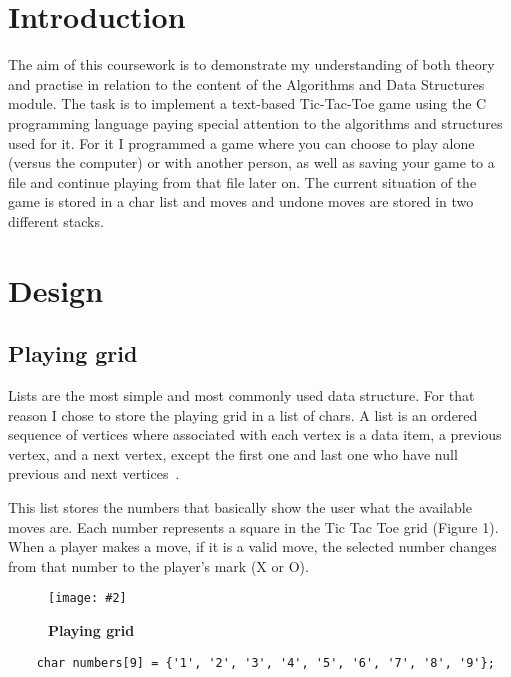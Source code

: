 \documentclass[10pt, a4paper]{article}
\title{\mytitle}
\author{\myauthor\hspace{1em}\\\contact\\Edinburgh Napier University\hspace{0.5em}-\hspace{0.5em}\mymodule}
\date{}
\newcommand{\figuremacro}[5]{
    \begin{figure}[#1]
        \centering
        \texttt{[image: \#2]}
        \caption[#3]{\textbf{#3}#4}
        \label{fig:#2}
    \end{figure}
}
\begin{document}
    \maketitle

    \section{Introduction}

The aim of this coursework is to demonstrate my understanding of both theory and practise in relation to the content of the Algorithms and Data Structures module. The task is to implement a text-based Tic-Tac-Toe game using the C programming language paying special attention to the algorithms and structures used for it. For it I programmed a game where you can choose to play alone (versus the computer) or with another person, as well as saving your game to a file and continue playing from that file later on. The current situation of the game is stored in a char list and  moves and undone moves are stored in two different stacks.

	\section{Design}

    \subsection{Playing grid}

Lists are the most simple and most commonly used data structure. For that reason I chose to store the playing grid in a list of chars. A list is an ordered sequence of vertices where associated with each vertex is a data item, a previous vertex, and a next vertex, except the first one and last one who have null previous and next vertices~\cite{storer_2013}.

This list stores the numbers that basically show the user what the available moves are. Each number represents a square in the Tic Tac Toe grid (Figure 1). When a player makes a move, if it is a valid move, the selected number changes from that number to the player's mark (X or O).

\figuremacro{h}{playing}{Playing grid}{}{0.9}

\begin{lstlisting}
    char numbers[9] = {'1', '2', '3', '4', '5', '6', '7', '8', '9'};
\end{lstlisting}
\end{document}
